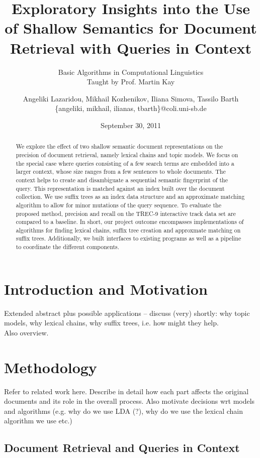 \documentclass[11pt, a4paper, abstraction]{scrartcl}
\title{Exploratory Insights into the Use of Shallow Semantics for Document Retrieval with Queries in Context}
\author{Angeliki Lazaridou, Mikhail Kozhenikov, Iliana Simova, Tassilo Barth \\\{angeliki, mikhail, ilianas, tbarth\}@coli.uni-sb.de}
\date{September 30, 2011}
\subtitle{Basic Algorithms in Computational Linguistics \\ %
		Taught by Prof. Martin Kay}
\begin{document}
\maketitle

\begin{abstract}
We explore the effect of two shallow semantic document representations on the precision of document retrieval, namely lexical chains and topic models. We focus on the special case where queries consisting of a few search terms are embedded into a larger context, whose size ranges from a few sentences to whole documents. The context helps to create and disambiguate a sequential semantic fingerprint of the query. This representation is matched against an index built over the document collection. We use suffix trees as an index data structure and an approximate matching algorithm to allow for minor mutations of the query sequence. To evaluate the proposed method, precision and recall on the TREC-9 interactive track data set are compared to a baseline. In short, our project outcome encompasses implementations of algorithms for finding lexical chains, suffix tree creation and approxmate matching on suffix trees. Additionally, we built interfaces to existing programs as well as a pipeline to coordinate the different components.
\end{abstract}

\newpage

\tableofcontents

\newpage

\section{Introduction and Motivation}

Extended abstract plus possible applications -- discuss (very) shortly: why topic models, why lexical chains, why suffix trees, i.e. how might they help. \\
Also overview.

\section{Methodology}

Refer to related work here. Describe in detail how each part affects the original documents and its role in the overall process. Also motivate decisions wrt models and algorithms (e.g. why do we use LDA (?), why do we use the lexical chain algorithm we use etc.)

\subsection{Document Retrieval and Queries in Context}
\end{document}
